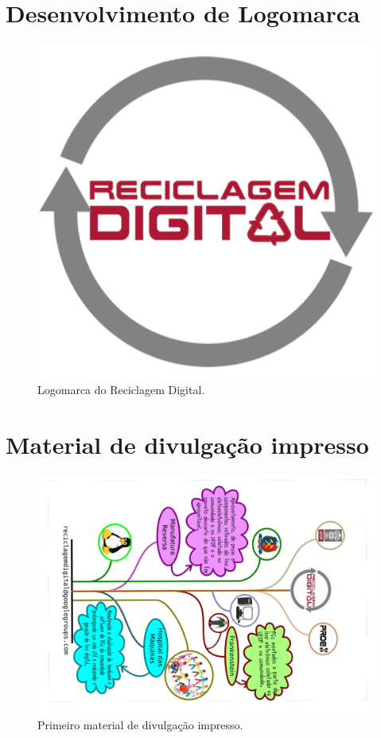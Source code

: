 \documentclass[
	12pt,				%
	openright,			%
	oneside,			%
	a4paper,			%
	english,			%
	spanish,			%
	brazil,				%
	]{abntex2}
\begin{document}
\begin{apendicesenv}
\chapter{Desenvolvimento de Logomarca}
\begin{figure}[H]
	\centering
	\includegraphics[scale=0.5]{figuras/logo-atual-reciclagem-digital-transparente.pdf}
	\caption{Logomarca do Reciclagem Digital.} \label{fig:logo} 
\end{figure}

\chapter{Material de divulgação impresso}
\begin{figure}
	\centering
	\includegraphics[scale=0.8,angle=90, scale=0.5]{figuras/panfleto.pdf}
	\caption{Primeiro material de divulgação impresso.}  \label{fig:divulgacao} 
\end{figure} 

\end{apendicesenv}
\end{document}

